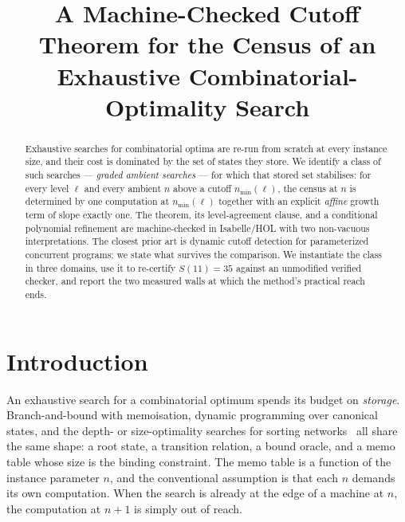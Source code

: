 \documentclass[11pt,a4paper]{article}
\title{A Machine-Checked Cutoff Theorem for the Census of an\\
       Exhaustive Combinatorial-Optimality Search}
\author{}
\date{}
\theoremstyle{plain}
\theoremstyle{definition}
\theoremstyle{remark}
\newcommand{\nmin}{n_{\min}}
\begin{document}
\maketitle

\begin{abstract}
\noindent
Exhaustive searches for combinatorial optima are re-run from scratch at every
instance size, and their cost is dominated by the set of states they store.
We identify a class of such searches --- \emph{graded ambient searches} --- for
which that stored set stabilises: for every level $\ell$ and every ambient
$n$ above a cutoff $\nmin(\ell)$, the census at $n$ is determined by one
computation at $\nmin(\ell)$ together with an explicit \emph{affine} growth
term of slope exactly one. The theorem, its level-agreement clause, and a
conditional polynomial refinement are machine-checked in Isabelle/HOL with two
non-vacuous interpretations. The closest prior art is dynamic cutoff detection
for parameterized concurrent programs; we state what survives the comparison.
We instantiate the class in three domains, use it to re-certify $S(11)=35$
against an unmodified verified checker, and report the two measured walls at
which the method's practical reach ends.
\end{abstract}

\section{Introduction}

An exhaustive search for a combinatorial optimum spends its budget on
\emph{storage}. Branch-and-bound with memoisation, dynamic programming over
canonical states, and the depth- or size-optimality searches for sorting
networks~\cite{Knuth73,BZ14,CCFS16,Harder20} all share the same shape: a root
state, a transition relation, a
bound oracle, and a memo table whose size is the binding constraint. The memo
table is a function of the instance parameter $n$, and the conventional
assumption is that each $n$ demands its own computation. When the search is
already at the edge of a machine at $n$, the computation at $n+1$ is simply
out of reach.
\end{document}
